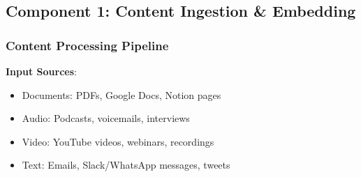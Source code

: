 \documentclass[10pt]{article}
\begin{document}
\subsection{Component 1: Content Ingestion \& Embedding}

\subsubsection{Content Processing Pipeline}

\textbf{Input Sources}:
\begin{itemize}[leftmargin=*]
    \item Documents: PDFs, Google Docs, Notion pages
    \item Audio: Podcasts, voicemails, interviews
    \item Video: YouTube videos, webinars, recordings
    \item Text: Emails, Slack/WhatsApp messages, tweets
\end{itemize}
\end{document}
